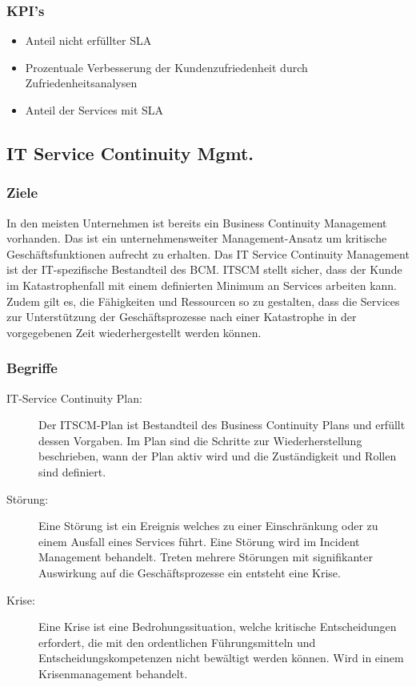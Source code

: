 \subsubsection{KPI's}

\begin{itemize}
	\item Anteil nicht erfüllter SLA
	\item Prozentuale Verbesserung der Kundenzufriedenheit durch Zufriedenheitsanalysen
	\item Anteil der Services mit SLA
\end{itemize}

\subsection{IT Service Continuity Mgmt.}

\subsubsection{Ziele}

In den meisten Unternehmen ist bereits ein Business Continuity Management vorhanden. Das ist ein unternehmensweiter Management-Ansatz um kritische Geschäftsfunktionen aufrecht zu erhalten. Das IT Service Continuity Management ist der IT-spezifische Bestandteil des BCM. ITSCM stellt sicher, dass der Kunde im Katastrophenfall mit einem definierten Minimum an Services arbeiten kann. Zudem gilt es, die Fähigkeiten und Ressourcen so zu gestalten, dass die Services zur Unterstützung der Geschäftsprozesse nach einer Katastrophe in der vorgegebenen Zeit wiederhergestellt werden können.

\subsubsection{Begriffe}

\begin{description}
	\item[IT-Service Continuity Plan:] Der ITSCM-Plan ist Bestandteil des Business Continuity Plans und erfüllt dessen Vorgaben. Im Plan sind die Schritte zur Wiederherstellung beschrieben, wann der Plan aktiv wird und die Zuständigkeit und Rollen sind definiert.
	\item[Störung:] Eine Störung ist ein Ereignis welches zu einer Einschränkung oder zu einem Ausfall eines Services führt. Eine Störung wird im Incident Management behandelt. Treten mehrere Störungen mit signifikanter Auswirkung auf die Geschäftsprozesse ein entsteht eine Krise.
	\item[Krise:] Eine Krise ist eine Bedrohungssituation, welche kritische Entscheidungen erfordert, die mit den ordentlichen Führungsmitteln und Entscheidungskompetenzen nicht bewältigt werden können. Wird in einem Krisenmanagement behandelt.
\end{description}

